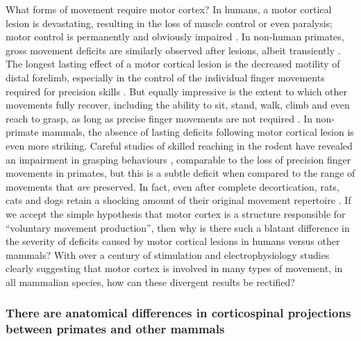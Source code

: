 What forms of movement require motor cortex? In humans, a motor cortical lesion is devastating, resulting in the loss of muscle control or even paralysis; motor control is permanently and obviously impaired \cite{Laplane1977}. In non-human primates, gross movement deficits are similarly observed after lesions, albeit transiently \cite{Leyton1917}. The longest lasting effect of a motor cortical lesion is the decreased motility of distal forelimb, especially in the control of the individual finger movements required for precision skills \cite{Leyton1917,Darling2011}. But equally impressive is the extent to which other movements fully recover, including the ability to sit, stand, walk, climb and even reach to grasp, as long as precise finger movements are not required \cite{Leyton1917,Darling2011,Zaaimi2012}. In non-primate mammals, the absence of lasting deficits following motor cortical lesion is even more striking. Careful studies of skilled reaching in the rodent have revealed an impairment in grasping behaviours \cite{Alaverdashvili2008a}, comparable to the loss of precision finger movements in primates, but this is a subtle deficit when compared to the range of movements that \emph{are} preserved. In fact, even after complete decortication, rats, cats and dogs retain a shocking amount of their original movement repertoire \cite{Bjursten1976,Terry1989}. If we accept the simple hypothesis that motor cortex is a structure responsible for ``voluntary movement production'', then why is there such a blatant difference in the severity of deficits caused by motor cortical lesions in humans versus other mammals? With over a century of stimulation and electrophysiology studies clearly suggesting that motor cortex is involved in many types of movement, in all mammalian species, how can these divergent results be rectified?

\subsubsection*{There are anatomical differences in corticospinal projections between primates and other mammals}

